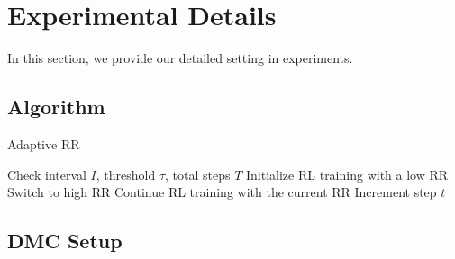 \newpage
\section{Experimental Details}
In this section, we provide our detailed setting in experiments. 

\subsection{Algorithm}

\begin{center}
\begin{minipage}{.55\linewidth}
\begin{algorithm}[H]
 \caption{Adaptive RR}
  \begin{algorithmic}[1]
    \Require Check interval $I$, threshold $\tau$, total steps $T$
    \State Initialize RL training with a low RR
            \State Switch to high RR 
        \EndIf
        \State Continue RL training with the current RR
        \State Increment step $t$
     \EndWhile
  \end{algorithmic}
  \label{algo:main}
\end{algorithm}
\end{minipage}
\end{center}

\subsection{DMC Setup}

